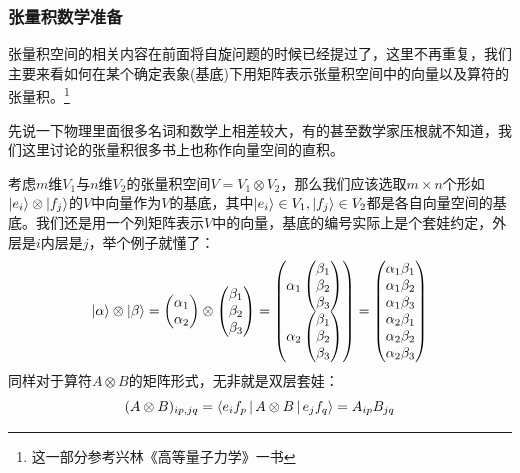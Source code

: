 \subsubsection*{张量积数学准备}
张量积空间的相关内容在前面将自旋问题的时候已经提过了，这里不再重复，我们主要来看如何在某个确定表象(基底)下用矩阵表示张量积空间中的向量以及算符的张量积。\footnote{这一部分参考兴林《高等量子力学》一书}

先说一下物理里面很多名词和数学上相差较大，有的甚至数学家压根就不知道，我们这里讨论的张量积很多书上也称作向量空间的直积。

考虑$m$维$V_1$与$n$维$V_2$的张量积空间$V=V_1\otimes V_2$，那么我们应该选取$m\times n$个形如$\ket{e_i}\otimes\ket{f_j}$的$V$中向量作为$V$的基底，其中$\ket{e_i}\in V_1,\ket{f_j}\in V_2$都是各自向量空间的基底。我们还是用一个列矩阵表示$V$中的向量，基底的编号实际上是个套娃约定，外层是$i$内层是$j$，举个例子就懂了：
\begin{equation}
	\ket{\alpha}\otimes\ket{\beta}=\begin{pmatrix}
		\alpha_1\\
		\alpha_2
	\end{pmatrix}\otimes \begin{pmatrix}
		\beta_1\\
		\beta_2\\
		\beta_3
	\end{pmatrix}
	=\begin{pmatrix}
		\alpha_1 \begin{pmatrix}
			\beta_1\\
			\beta_2\\
			\beta_3
		\end{pmatrix}\\
		\alpha_2 \begin{pmatrix}
			\beta_1\\
			\beta_2\\
			\beta_3
		\end{pmatrix}
	\end{pmatrix}
	=\begin{pmatrix}
		\alpha_1\beta_1 \\
		\alpha_1\beta_2 \\
		\alpha_1\beta_3\\
		\alpha_2\beta_1 \\
		\alpha_2\beta_2\\
		\alpha_2\beta_3
	\end{pmatrix}
\end{equation}
同样对于算符$A\otimes B$的矩阵形式，无非就是双层套娃：
\[(A\otimes B)_{ip,jq}=\Braket{e_if_p|A\otimes B|e_jf_q}=A_{ip}B_{jq}\]
